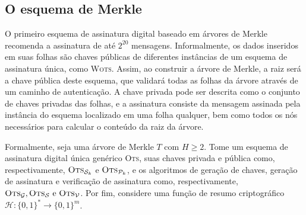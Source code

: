 \documentclass[12pt]{report}
\newcommand{\hh}{\mathcal{H}}
\newcommand{\pk}{\mathcal{P}_k}
\newcommand{\sk}{\mathcal{S}_k}
\newcommand{\binwds}[1]{\{0, 1\}^{#1}}
\newcommand{\fhash}[1]{\hh{} : \binwds{*} \longrightarrow \binwds{#1}}
\begin{document}
\subsection{O esquema de Merkle}

O primeiro esquema de assinatura digital baseado em árvores de Merkle
\cite{Merkle:1989:CDS:118209.118230} recomenda a assinatura de até $2^{20}$
mensagens. Informalmente, os dados inseridos em suas folhas são chaves públicas
de diferentes instâncias de um esquema de assinatura única, como \textsc{Wots}.
Assim, ao construir a árvore de Merkle, a raiz será a chave pública deste
esquema, que validará todas as folhas da árvore através de um caminho de
autenticação. A chave privada pode ser descrita como o conjunto de chaves
privadas das folhas, e a assinatura consiste da mensagem assinada pela
instância do esquema localizado em uma folha qualquer, bem como todos os nós
necessários para calcular o conteúdo da raiz da árvore.

Formalmente, seja uma árvore de Merkle $T$ com $H \geq 2$. Tome um esquema de
assinatura digital única genérico \textsc{Ots}, suas chaves privada e pública
como, respectivamente, $\textsc{Ots}_{\sk{}}$ e $\textsc{Ots}_{\pk{}}$, e os
algoritmos de geração de chaves, geração de assinatura e verificação de
assinatura como, respectivamente, $\textsc{Ots}_\mathcal{G},
\textsc{Ots}_\mathcal{S} \text{ e } \textsc{Ots}_\mathcal{V}$. Por fim,
considere uma função de resumo criptográfico $\fhash{m}$.
\end{document}
